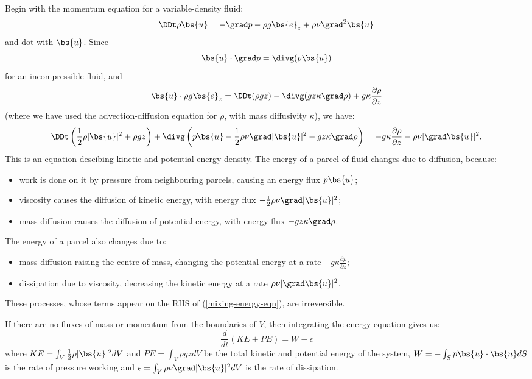 Begin with the momentum equation for a variable-density fluid:
\begin{equation}
    \DDt\rho\bs{u} = -\grad p - \rho g \bs{e}_z + \rho\nu\grad^2\bs{u}
\end{equation}
and dot with $\bs{u}$. Since
\begin{equation}
    \bs{u}\cdot\grad p = \divg(p\bs{u})
\end{equation}
for an incompressible fluid, and 
\begin{equation}
    \bs{u}\cdot\rho g \bs{e}_z = \DDt(\rho gz) - \divg(gz\kappa\grad\rho) +
    g\kappa\frac{\partial\rho}{\partial z}
\end{equation}
(where we have used the advection-diffusion equation for $\rho$, with mass
diffusivity $\kappa$), we have:
\begin{equation}
    \DDt\left(\frac{1}{2}\rho|\bs{u}|^2 + \rho gz\right)
    + \divg\left(p\bs{u} - \frac{1}{2}\rho\nu\grad|\bs{u}|^2 
       - gz\kappa\grad\rho\right)
    = -g\kappa\frac{\partial\rho}{\partial z} 
    - \rho\nu|\grad\bs{u}|^2.
    \label{mixing-energy-eqn}
\end{equation}
This is an equation descibing kinetic and potential energy density. The energy
of a parcel of fluid changes due to diffusion, because:
\begin{itemize}
    \item work is done on it by pressure from neighbouring parcels, causing an
        energy flux $p\bs{u}$; 
    \item viscosity causes the diffusion of kinetic energy, with energy flux
        $-\frac{1}{2}\rho\nu\grad|\bs{u}|^2$;
    \item mass diffusion causes the diffusion of potential energy, with energy
        flux $- gz\kappa\grad\rho$.
\end{itemize}
The energy of a parcel also changes due to:
\begin{itemize}
    \item mass diffusion raising the centre of mass, changing the potential
        energy at a rate $-g\kappa\frac{\partial\rho}{\partial z}$;
    \item dissipation due to viscosity, decreasing the kinetic energy at a rate
        $\rho\nu|\grad\bs{u}|^2$.
\end{itemize}
These processes, whose terms appear on the RHS of (\ref{mixing-energy-eqn}), are
irreversible.

If there are no fluxes of mass or momentum from the boundaries of $V$, then
integrating the energy equation gives us:
\begin{equation}
    \frac{d}{dt}(KE + PE) = W-\epsilon
\end{equation}
where $KE = \int_V \frac{1}{2}\rho|\bs{u}|^2 dV$ and $PE = \int_V \rho gz dV$ be
the total kinetic and potential energy of the system, $W = -\int_S p
\bs{u}\cdot\bs{n} dS$ is the rate of pressure working and $\epsilon = \int_V
\rho\nu\grad|\bs{u}|^2 dV$ is the rate of dissipation.


